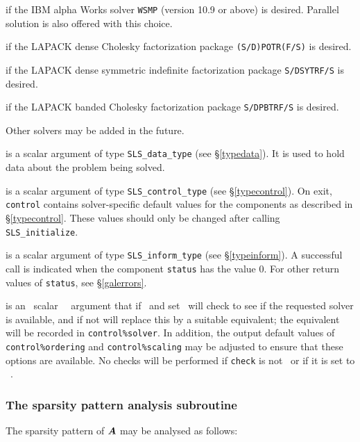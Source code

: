 \documentclass{galahad}
\newcommand{\packagename}{SLS}
\begin{document}
\begin{description}
\begin{description}
 if the IBM alpha Works solver {\tt WSMP} (version 10.9
or above) is desired. Parallel solution is also offered with this choice.

 if the LAPACK dense Cholesky factorization package
{\tt (S/D)POTR(F/S)} is desired.

 if the LAPACK dense symmetric indefinite factorization package
{\tt S/DSYTRF/S} is desired.

 if the LAPACK banded Cholesky factorization package
{\tt S/DPBTRF/S} is desired.

\end{description}
Other solvers may be added in the future.

 is a scalar \intentout argument of type
{\tt \packagename\_data\_type}
(see \S\ref{typedata}). It is used to hold data about the problem being
solved.

 is a scalar \intentout argument of type
{\tt \packagename\_control\_type}
(see \S\ref{typecontrol}).
On exit, {\tt control} contains solver-specific default values for the
components as described in \S\ref{typecontrol}.
These values should only be changed after calling
{\tt \packagename\_initialize}.

 is a scalar \intentout argument of type
{\tt \packagename\_inform\_type}
(see \S\ref{typeinform}).
A successful call is indicated when the  component {\tt status} has the value 0.
For other return values of {\tt status}, see \S\ref{galerrors}.

 is an \optional\ scalar \logical\ \intentin\ argument 
that if \present\ and set \true\ will check to see if the requested solver 
is available, and if not will replace this by a suitable equivalent; the 
equivalent will be recorded in {\tt control\%solver}. 
In addition, the output default values of
{\tt control\%ordering} and {\tt control\%scaling} may be adjusted to ensure
that these options are available.
No checks will be performed if {\tt check} is not \present\ or if it is set
to \false\ .
\end{description}


\subsubsection{The sparsity pattern analysis subroutine}
The sparsity pattern of ${\bm{A}}$ may be analysed as follows:
\end{document}
